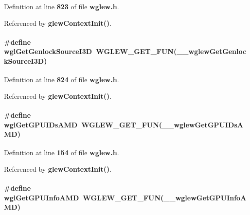 Definition at line {\bf 823} of file {\bf wglew.\+h}.



Referenced by {\bf glew\+Context\+Init()}.

\paragraph[{wgl\+Get\+Genlock\+Source\+I3D}]{\setlength{\rightskip}{0pt plus 5cm}\#define wgl\+Get\+Genlock\+Source\+I3D~{\bf W\+G\+L\+E\+W\+\_\+\+G\+E\+T\+\_\+\+F\+UN}({\bf \+\_\+\+\_\+wglew\+Get\+Genlock\+Source\+I3D})}\label{wglew_8h_ad5f61ed9805c03705b3aa89147afdc92}


Definition at line {\bf 824} of file {\bf wglew.\+h}.



Referenced by {\bf glew\+Context\+Init()}.

\paragraph[{wgl\+Get\+G\+P\+U\+I\+Ds\+A\+MD}]{\setlength{\rightskip}{0pt plus 5cm}\#define wgl\+Get\+G\+P\+U\+I\+Ds\+A\+MD~{\bf W\+G\+L\+E\+W\+\_\+\+G\+E\+T\+\_\+\+F\+UN}({\bf \+\_\+\+\_\+wglew\+Get\+G\+P\+U\+I\+Ds\+A\+MD})}\label{wglew_8h_a2ecd0a82dd2131c09d5afe3890d72712}


Definition at line {\bf 154} of file {\bf wglew.\+h}.



Referenced by {\bf glew\+Context\+Init()}.

\paragraph[{wgl\+Get\+G\+P\+U\+Info\+A\+MD}]{\setlength{\rightskip}{0pt plus 5cm}\#define wgl\+Get\+G\+P\+U\+Info\+A\+MD~{\bf W\+G\+L\+E\+W\+\_\+\+G\+E\+T\+\_\+\+F\+UN}({\bf \+\_\+\+\_\+wglew\+Get\+G\+P\+U\+Info\+A\+MD})}\label{wglew_8h_af4eb482ede0e823855427b9aadae1bf0}


